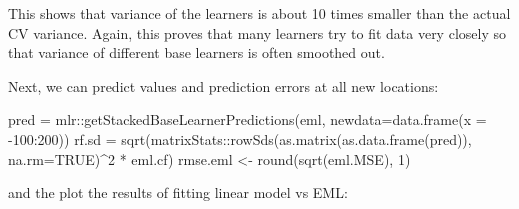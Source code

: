 \documentclass[
  graybox,natbib,nospthms]{svmono}
\newenvironment{Shaded}{\begin{snugshade}}{\end{snugshade}}
\newcommand{\AttributeTok}[1]{\textcolor[rgb]{0.61,0.61,0.61}{#1}}
\newcommand{\ConstantTok}[1]{\textcolor[rgb]{0,0,0}{#1}}
\newcommand{\DecValTok}[1]{\textcolor[rgb]{0.06,0.06,0.06}{#1}}
\newcommand{\FunctionTok}[1]{\textcolor[rgb]{0,0,0}{#1}}
\newcommand{\NormalTok}[1]{#1}
\newcommand{\OtherTok}[1]{\textcolor[rgb]{0.37,0.37,0.37}{#1}}
\newcommand{\SpecialCharTok}[1]{\textcolor[rgb]{0,0,0}{#1}}
\begin{document}
This shows that variance of the learners is about 10 times smaller than
the actual CV variance. Again, this proves that many learners try to fit
data very closely so that variance of different base learners is often
smoothed out.

Next, we can predict values and prediction errors at all new locations:

\begin{Shaded}
\begin{Highlighting}[]
\NormalTok{pred }\OtherTok{=}\NormalTok{ mlr}\SpecialCharTok{::}\FunctionTok{getStackedBaseLearnerPredictions}\NormalTok{(eml, }\AttributeTok{newdata=}\FunctionTok{data.frame}\NormalTok{(}\AttributeTok{x =} \SpecialCharTok{{-}}\DecValTok{100}\SpecialCharTok{:}\DecValTok{200}\NormalTok{))}
\NormalTok{rf.sd }\OtherTok{=} \FunctionTok{sqrt}\NormalTok{(matrixStats}\SpecialCharTok{::}\FunctionTok{rowSds}\NormalTok{(}\FunctionTok{as.matrix}\NormalTok{(}\FunctionTok{as.data.frame}\NormalTok{(pred)), }\AttributeTok{na.rm=}\ConstantTok{TRUE}\NormalTok{)}\SpecialCharTok{\^{}}\DecValTok{2} \SpecialCharTok{*}\NormalTok{ eml.cf)}
\NormalTok{rmse.eml }\OtherTok{\textless{}{-}} \FunctionTok{round}\NormalTok{(}\FunctionTok{sqrt}\NormalTok{(eml.MSE), }\DecValTok{1}\NormalTok{)}
\end{Highlighting}
\end{Shaded}

and the plot the results of fitting linear model vs EML:
\end{document}
